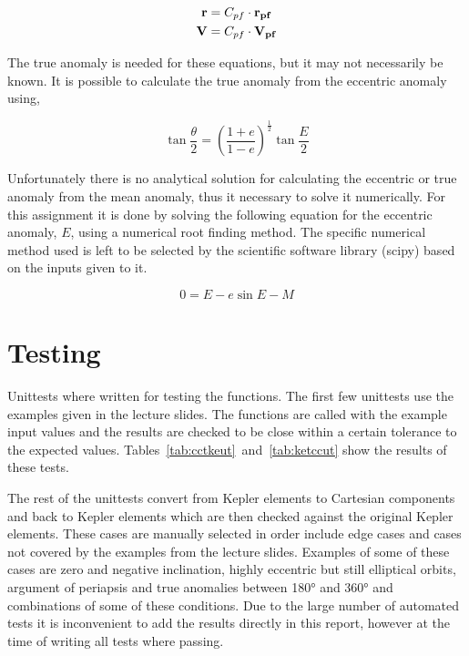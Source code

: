    \begin{align}
        \mathbf{r} &= C_{pf} \cdot \mathbf{r_{pf}} \\
        \mathbf{V} &= C_{pf} \cdot \mathbf{V_{pf}}
    \end{align}

    The true anomaly is needed for these equations, but it may not necessarily be known. It is possible to calculate the true anomaly from the eccentric anomaly using,

    \begin{equation}
        \tan{\frac{\theta}{2}} = \left(\frac{1+e}{1-e}\right)^{\frac{1}{2}}
                                 \tan{\frac{E}{2}}
    \end{equation}

    Unfortunately there is no analytical solution for calculating the eccentric or true anomaly from the mean anomaly, thus it necessary to solve it numerically. For this assignment it is done by solving the following equation for the eccentric anomaly, $E$, using a numerical root finding method. The specific numerical method used is left to be selected by the scientific software library (scipy) based on the inputs given to it.

    \begin{equation}
        0 = E - e \sin{E} - M
    \end{equation}

    
    \section{Testing}
    Unittests where written for testing the functions. The first few unittests use the examples given in the lecture slides. The functions are called with the example input values and the results are checked to be close within a certain tolerance to the expected values. Tables~\ref{tab:cctkeut}~and~\ref{tab:ketccut} show the results of these tests.
    
    The rest of the unittests convert from Kepler elements to Cartesian components and back to Kepler elements which are then checked against the original Kepler elements. These cases are manually selected in order include edge cases and cases not covered by the examples from the lecture slides. Examples of some of these cases are zero and negative inclination, highly eccentric but still elliptical orbits, argument of periapsis and true anomalies between 180° and 360° and combinations of some of these conditions. Due to the large number of automated tests it is inconvenient to add the results directly in this report, however at the time of writing all tests where passing.
    
